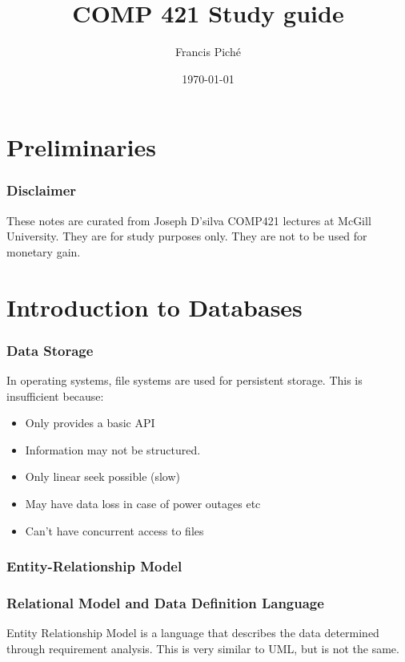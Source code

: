 \documentclass[12pt]{article}
\theoremstyle{definition}
\begin{document}
\title{COMP 421 Study guide}
\author{Francis Pich\'e}
\date{\today}
\maketitle
\newpage
\tableofcontents
\newpage

\part{Preliminaries}
\section{Disclaimer}
These notes are curated from Joseph D'silva COMP421 lectures at McGill University. They are for study purposes only. They are not to be used for monetary gain.

\part{Introduction to Databases}
\section{Data Storage}
In operating systems, file systems are used for persistent storage. This is insufficient because:
\begin{itemize}
	\item Only provides a basic API
	\item Information may not be structured.
	\item Only linear seek possible (slow)
	\item May have data loss in case of power outages etc
	\item Can't have concurrent access to files
\end{itemize}

\section{Entity-Relationship Model}

\section{Relational Model and Data Definition Language}
Entity Relationship Model is a language that describes the data determined through requirement analysis. This is very similar to UML, but is not the same. 
\end{document}
